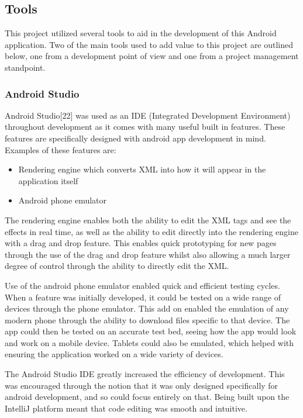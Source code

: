 \documentclass{article}
\begin{document}
\subsection{Tools}

This project utilized several tools to aid in the development of this Android application. Two of the main tools used to add value to this project are outlined below, one from a development point of view and one from a project management standpoint. 

\subsubsection{Android Studio}

Android Studio[22] was used as an IDE (Integrated Development Environment) throughout development as it comes with many useful built in features. These features are specifically designed with android app development in mind. Examples of these features are: 

\begin{itemize}
	\item Rendering engine which converts XML into how it will appear in the application itself
	\item Android phone emulator
\end{itemize}

The rendering engine enables both the ability to edit the XML tags and see the effects in real time, as well as the ability to edit directly into the rendering engine with a drag and drop feature. This enables quick prototyping for new pages through the use of the drag and drop feature whilst also allowing a much larger degree of control through the ability to directly edit the XML. \par

Use of the android phone emulator enabled quick and efficient testing cycles. When a feature was initially developed, it could be tested on a wide range of devices through the phone emulator. This add on enabled the emulation of any modern phone through the ability to download files specific to that device. The app could then be tested on an accurate test bed, seeing how the app would look and work on a mobile device. Tablets could also be emulated, which helped with ensuring the application worked on a wide variety of devices. \par

The Android Studio IDE greatly increased the efficiency of development. This was encouraged through the notion that it was only designed specifically for android development, and so could focus entirely on that. Being built upon the IntelliJ platform meant that code editing was smooth and intuitive. \par
\end{document}
